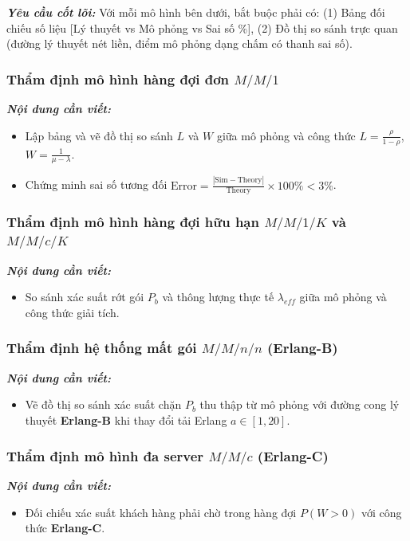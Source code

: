 \textit{\textbf{Yêu cầu cốt lõi:}} Với mỗi mô hình bên dưới, bắt buộc phải có: (1) Bảng đối chiếu số liệu [Lý thuyết vs Mô phỏng vs Sai số \%], (2) Đồ thị so sánh trực quan (đường lý thuyết nét liền, điểm mô phỏng dạng chấm có thanh sai số).

\subsubsection{Thẩm định mô hình hàng đợi đơn \texorpdfstring{$M/M/1$}{M/M/1}}
\textit{\textbf{Nội dung cần viết:}}
\begin{itemize}[leftmargin=1.5em]
    \item Lập bảng và vẽ đồ thị so sánh $L$ và $W$ giữa mô phỏng và công thức $L = \frac{\rho}{1-\rho}$, $W = \frac{1}{\mu - \lambda}$.
    \item Chứng minh sai số tương đối $\text{Error} = \frac{|\text{Sim} - \text{Theory}|}{\text{Theory}} \times 100\% < 3\%$.
\end{itemize}

\subsubsection{Thẩm định mô hình hàng đợi hữu hạn \texorpdfstring{$M/M/1/K$}{M/M/1/K} và \texorpdfstring{$M/M/c/K$}{M/M/c/K}}
\textit{\textbf{Nội dung cần viết:}}
\begin{itemize}[leftmargin=1.5em]
    \item So sánh xác suất rớt gói $P_b$ và thông lượng thực tế $\lambda_{eff}$ giữa mô phỏng và công thức giải tích.
\end{itemize}

\subsubsection{Thẩm định hệ thống mất gói \texorpdfstring{$M/M/n/n$}{M/M/n/n} (Erlang-B)}
\textit{\textbf{Nội dung cần viết:}}
\begin{itemize}[leftmargin=1.5em]
    \item Vẽ đồ thị so sánh xác suất chặn $P_b$ thu thập từ mô phỏng với đường cong lý thuyết \textbf{Erlang-B} khi thay đổi tải Erlang $a \in [1, 20]$.
\end{itemize}

\subsubsection{Thẩm định mô hình đa server \texorpdfstring{$M/M/c$}{M/M/c} (Erlang-C)}
\textit{\textbf{Nội dung cần viết:}}
\begin{itemize}[leftmargin=1.5em]
    \item Đối chiếu xác suất khách hàng phải chờ trong hàng đợi $P(W > 0)$ với công thức \textbf{Erlang-C}.
\end{itemize}

